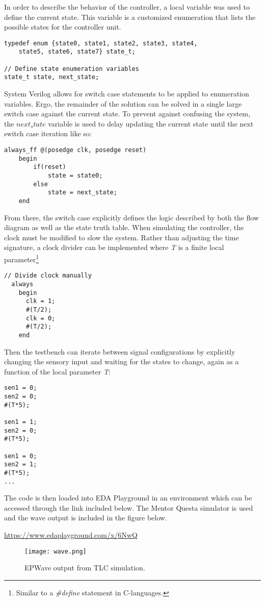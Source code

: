 In order to describe the behavior of the controller, a local variable was used to define the current state. This variable is a customized enumeration that lists the possible states for the controller unit.

\begin{lstlisting}[style=verilog]
typedef enum {state0, state1, state2, state3, state4,
	state5, state6, state7} state_t;

// Define state enumeration variables
state_t state, next_state;
\end{lstlisting}

System Verilog allows for switch case statements to be applied to enumeration variables. Ergo, the remainder of the solution can be solved in a single large switch case against the current state. To prevent against confusing the system, the $next_state$ variable is used to delay updating the current state until the next switch case iteration like so:

\begin{lstlisting}[style=verilog]
always_ff @(posedge clk, posedge reset)
	begin
		if(reset)
			state = state0;
		else
			state = next_state;
	end
\end{lstlisting}

From there, the switch case explicitly defines the logic described by both the flow diagram as well as the state truth table. When simulating the controller, the clock must be modified to slow the system. Rather than adjusting the time signature, a clock divider can be implemented where \textit{T} is a finite local parameter\footnote{Similar to a \textit{\#define} statement in C-languages.}

\begin{lstlisting}[style=verilog]
// Divide clock manually
  always
    begin
      clk = 1;
      #(T/2);
      clk = 0;
      #(T/2);
    end
\end{lstlisting}

Then the testbench can iterate between signal configurations by explicitly changing the sensory input and waiting for the states to change, again as a function of the local parameter \textit{T}:

\begin{lstlisting}[style=verilog]
sen1 = 0;
sen2 = 0;
#(T*5);

sen1 = 1;
sen2 = 0;
#(T*5);

sen1 = 0;
sen2 = 1;
#(T*5);
...
\end{lstlisting}

The code is then loaded into EDA Playground in an environment which can be accessed through the link included below. The Mentor Questa simulator is used and the wave output is included in the figure below.

\begin{center}
\url{https://www.edaplayground.com/x/6NwQ}
\end{center}

\begin{figure}[h!]
	\texttt{[image: wave.png]}
	\caption{EPWave output from TLC simulation.}
\end{figure}





